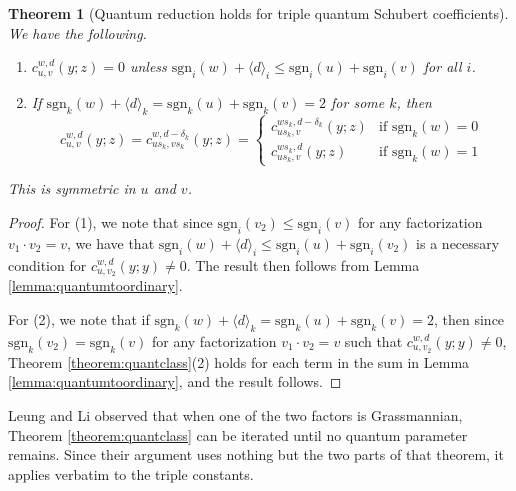 \documentclass{amsart}
\newtheorem{theorem}[lemma]{Theorem}
\theoremstyle{definition}
\theoremstyle{remark}
\numberwithin{equation}{section}
\begin{document}
\begin{theorem}[Quantum reduction holds for triple quantum Schubert coefficients]\label{theorem:quantclassz}
We have the following.
	\begin{enumerate}
	\item $c_{u,v}^{w,d}(y;z)=0$ unless $\mathrm{sgn}_i(w)+\langle d\rangle_i\leq \mathrm{sgn}_i(u)+\mathrm{sgn}_i(v)$ for all $i$.
	\item If $\mathrm{sgn}_k(w)+\langle d\rangle_k=\mathrm{sgn}_k(u)+\mathrm{sgn}_k(v)=2$ for some $k$, then
	$$c_{u,v}^{w,d}(y;z)=c_{us_k,vs_k}^{w,d-\delta_k}(y;z)=\begin{cases}
	c_{us_k,v}^{ws_k,d-\delta_k}(y;z) & \text{if $\mathrm{sgn}_k(w)=0$}\\
	c_{us_k,v}^{ws_k,d}(y;z) & \text{if $\mathrm{sgn}_k(w)=1$}
	\end{cases}$$
	\end{enumerate}
	This is symmetric in $u$ and $v$.
\end{theorem}
\begin{proof}
For (1), we note that since $\mathrm{sgn}_i(v_2)\leq \mathrm{sgn}_i(v)$ for any factorization $v_1\cdot v_2=v$, we have that $\mathrm{sgn}_i(w)+\langle d\rangle_i\leq \mathrm{sgn}_i(u)+\mathrm{sgn}_i(v_2)$ is a necessary condition for $c_{u,v_2}^{w,d}(y;y)\neq 0$. The result then follows from Lemma \ref{lemma:quantumtoordinary}.

For (2), we note that if $\mathrm{sgn}_k(w)+\langle d\rangle_k=\mathrm{sgn}_k(u)+\mathrm{sgn}_k(v)=2$, then since $\mathrm{sgn}_k(v_2)=\mathrm{sgn}_k(v)$ for any factorization $v_1\cdot v_2=v$ such that $c_{u,v_2}^{w,d}(y;y)\neq 0$, Theorem \ref{theorem:quantclass}(2) holds for each term in the sum in Lemma \ref{lemma:quantumtoordinary}, and the result follows.
\end{proof}

Leung and Li \cite[Theorem~1.2]{leung2012classical} observed that when one of the two factors is Grassmannian, Theorem \ref{theorem:quantclass} can be iterated until no quantum parameter remains. Since their argument uses nothing but the two parts of that theorem, it applies verbatim to the triple constants.
\end{document}
